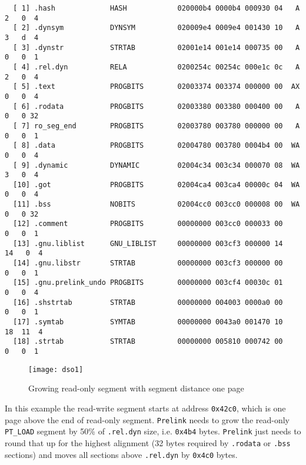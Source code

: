 \documentclass[twoside]{article}
\def\tts#1{\texttt{\small #1}}
\begin{document}
{{\begin{verbatim}
  [ 1] .hash             HASH            020000b4 0000b4 000930 04   A  2   0  4
  [ 2] .dynsym           DYNSYM          020009e4 0009e4 001430 10   A  3   d  4
  [ 3] .dynstr           STRTAB          02001e14 001e14 000735 00   A  0   0  1
  [ 4] .rel.dyn          RELA            0200254c 00254c 000e1c 0c   A  2   0  4
  [ 5] .text             PROGBITS        02003374 003374 000000 00  AX  0   0  4
  [ 6] .rodata           PROGBITS        02003380 003380 000400 00   A  0   0 32
  [ 7] ro_seg_end        PROGBITS        02003780 003780 000000 00   A  0   0  1
  [ 8] .data             PROGBITS        02004780 003780 0004b4 00  WA  0   0  4
  [ 9] .dynamic          DYNAMIC         02004c34 003c34 000070 08  WA  3   0  4
  [10] .got              PROGBITS        02004ca4 003ca4 00000c 04  WA  0   0  4
  [11] .bss              NOBITS          02004cc0 003cc0 000008 00  WA  0   0 32
  [12] .comment          PROGBITS        00000000 003cc0 000033 00      0   0  1
  [13] .gnu.liblist      GNU_LIBLIST     00000000 003cf3 000000 14     14   0  4
  [14] .gnu.libstr       STRTAB          00000000 003cf3 000000 00      0   0  1
  [15] .gnu.prelink_undo PROGBITS        00000000 003cf4 00030c 01      0   0  4
  [16] .shstrtab         STRTAB          00000000 004003 0000a0 00      0   0  1
  [17] .symtab           SYMTAB          00000000 0043a0 001470 10     18  11  4
  [18] .strtab           STRTAB          00000000 005810 000742 00      0   0  1
\end{verbatim}}
}

\begin{figure}[!ht]
\centering
\texttt{[image: dso1]}
\caption{Growing read-only segment with segment distance one page}
\end{figure}

In this example the read-write segment starts at address \tts{0x42c0}, which
is one page above the end of read-only segment.  \tts{Prelink} needs to grow
the read-only \tts{PT\_LOAD} segment by 50\% of \tts{.rel.dyn} size, i.e.
\tts{0x4b4} bytes.  \tts{Prelink} just needs to round that up for the
highest alignment (32 bytes required by \tts{.rodata} or \tts{.bss}
sections) and moves all sections above \tts{.rel.dyn} by \tts{0x4c0} bytes.
\end{document}
